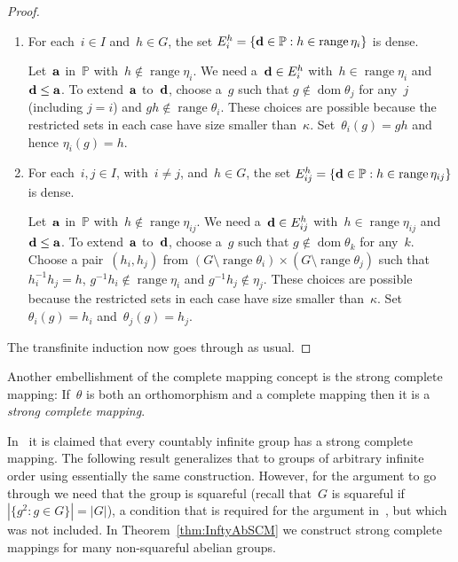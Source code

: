 \documentclass[12pt,a4paper]{article}
\DeclareMathOperator{\dom}{dom}
\DeclareMathOperator{\ran}{range}
\renewcommand{\P}{\mathbb{P}}
\begin{document}
\begin{proof}
\begin{enumerate}
\item For each~$i \in I$ and~$h \in G$, the set $E_i^h = \{ {\bf d} \in \P : h \in \ran \eta_i \}$ is dense.

Let~${\bf a}$ in~$\P$ with~$h \not\in \ran \eta_i$.  We need a~${\bf d} \in E_i^h$ with~$h \in \ran \eta_i$ and ${\bf d} \leq {\bf a}$.  To extend~${\bf a}$ to~${\bf d}$, choose a~$g$ such that $g \not\in \dom \theta_j$ for any~$j$ (including $j=i$) and $gh \not\in \ran \theta_i$.  These choices are possible because the restricted sets in each case have size smaller than~$\kappa$.  Set~$\theta_i(g) = gh$  and hence $\eta_i(g) = h$.   


\item For each~$i,j \in I$, with~$i \neq j$, and~$h \in G$, the set $E_{ij}^h = \{ {\bf d} \in \P : h \in \ran \eta_{ij} \}$ is dense.

Let~${\bf a}$ in~$\P$ with~$h \not\in \ran \eta_{ij}$.  We need a~${\bf d} \in E_{ij}^h$ with~$h \in \ran \eta_{ij}$ and ${\bf d} \leq {\bf a}$.  To extend~${\bf a}$ to~${\bf d}$, choose a~$g$ such that $g \not\in \dom \theta_k$ for any~$k$.   Choose a pair~$(h_i,h_j)$ from $(G \setminus \ran \theta_i) \times (G \setminus \ran \theta_j)$ such that~$h_i^{-1}h_j = h$, $g^{-1}h_i \not\in \ran \eta_i$ and $g^{-1}h_j \not\in \eta_j$. These choices are possible because the restricted sets in each case have size smaller than~$\kappa$.
 Set~$\theta_i(g) = h_i$ and~$\theta_j(g) = h_j$.


\end{enumerate}

The transfinite induction now goes through as usual.
\end{proof}






Another embellishment of the complete mapping concept is the strong complete mapping:
If~$\theta$ is both an orthomorphism and a complete mapping then it is a {\em strong complete mapping}.   

In~\cite{Evans12} it is claimed that every countably infinite group has a strong complete mapping.  The following result generalizes that to groups of arbitrary infinite order using essentially the same construction.  However, for the argument to go through we need that the group is squareful (recall that~$G$ is squareful if $|\{g^2 : g \in G \}| = |G|$), a condition that is required for the argument in~\cite{Evans12}, but which was not included.  In Theorem~\ref{thm:InftyAbSCM} we construct strong complete mappings for many non-squareful abelian groups.
\end{document}

